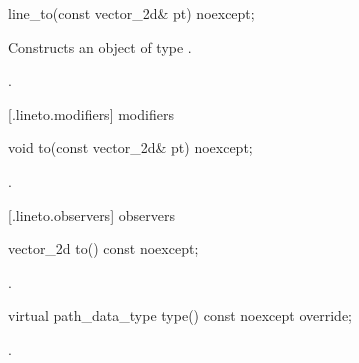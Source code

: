 \begin{itemdecl}
    line_to(const vector_2d& pt) noexcept;
\end{itemdecl}
\begin{itemdescr}
	\pnum
	\effects
	Constructs an object of type .
	
	\pnum
	\postconditions
	.
\end{itemdescr}

 [\iotwod.lineto.modifiers]{ modifiers}

\begin{itemdecl}
    void to(const vector_2d& pt) noexcept;
\end{itemdecl}
\begin{itemdescr}
	\pnum
	\postconditions
	.
	
\end{itemdescr}

 [\iotwod.lineto.observers]{ observers}

\begin{itemdecl}
    vector_2d to() const noexcept;
\end{itemdecl}
\begin{itemdescr}
	\pnum
	\returns
	.

\end{itemdescr}

\begin{itemdecl}
    virtual path_data_type type() const noexcept override;
\end{itemdecl}
\begin{itemdescr}
	\pnum
	\returns
	.

\end{itemdescr}

